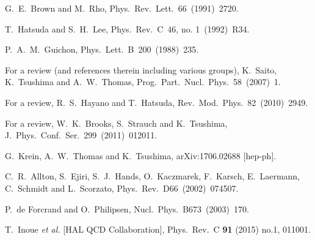 \documentclass[preprint,aps,showpacs,floatfix]{revtex4}
\begin{document}
\begin{thebibliography}{99}


G.~E.~Brown and M.~Rho,
  Phys.~Rev.~Lett.~66~(1991)~2720. %
  

  T.~Hatsuda and S.~H.~Lee,
  Phys.\ Rev.\ C~46, no. 1~(1992)~R34.  %


   P.~A.~M.~Guichon,
  Phys.~Lett.~B~200~(1988)~235.   
  
    
  For a review (and references therein including various groups),   
  K.~Saito, K.~Tsushima and A.~W.~Thomas,
  Prog.\ Part.\ Nucl.\ Phys.\ 58~(2007)~1.  %
  

  For a review, R.~S.~Hayano and T.~Hatsuda,
  Rev.\ Mod.\ Phys.\  82~(2010)~2949.    %
 
  
  For a review, W.~K.~Brooks, S.~Strauch and K.~Tsushima,
  J.\ Phys.\ Conf.\ Ser.\  299~(2011)~012011. %

  G.~Krein, A.~W.~Thomas and K.~Tsushima,
  arXiv:1706.02688 [hep-ph].
  

  C.~R.~Allton, S.~Ejiri, S.~J.~Hands, O.~Kaczmarek, F.~Karsch, E.~Laermann, C.~Schmidt and L.~Scorzato,
  Phys.\ Rev.\ D66~(2002)~074507.  %
  
  
  P.~de Forcrand and O.~Philipsen,
  Nucl.\ Phys.\ B673~(2003)~170.  %
  

  T.~Inoue {\it et al.} [HAL QCD Collaboration],
  Phys.\ Rev.\ C {\bf 91} (2015) no.1,  011001.



\end{thebibliography}
\end{document}
